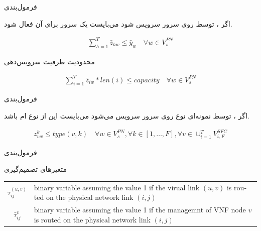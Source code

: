 \documentclass{beamer}
\begin{document}
\begin{persian}
\begin{frame}{فرمول‌بندی} %
    \par
    اگر ، 
    توسط  روی سرور 
    سرویس شود می‌بایست یک  سرور 
    برای آن فعال شود.
    \begin{latin}\begin{align}
        \sum_{h=1}^T
        \bar{z}_{hw} \le \bar{y}_w
        \quad
        \forall w \in V_{s}^{PN}
    \end{align}\end{latin}
    \par
    محدودیت ظرفیت سرویس‌دهی 
    \begin{latin}\begin{align}
        \sum_{i=1}^{T} \bar{z}_{iw} * len(i) \le capacity
        \quad
        \forall w \in V_{s}^{PN}
    \end{align}\end{latin}
\end{frame}
\begin{frame}{فرمول‌بندی} %
    \par
    اگر ، 
    توسط نمونه‌ای نوع 
    روی سرور  سرویس می‌شود می‌بایست
    این  از نوع ام باشد.
    \begin{latin}\begin{align}
        z_{vw}^{k} \le type(v, k)
        \quad
        \forall w \in V_{s}^{PN},
        \forall k \in [1,\ldots, F],
        \forall v \in \cup_{i=1}^T V_{i, F}^{SFC}
    \end{align}\end{latin}
\end{frame}
\begin{frame}{فرمول‌بندی} %
    \par
    متغیرهای تصمیم‌گیری
    \begin{latin}\begin{tabular}{c p{10cm}}
        $\tau^{(u,v)}_{ij}$ & binary variable assuming the value 1 if the virual link $(u,v)$ is routed on the physical network link $(i,j)$\\
        $\bar{\tau}^{v}_{ij}$ & binary variable assuming the value 1 if the managemnt of VNF node $v$ is routed on the physical network link $(i,j)$\\

\end{tabular}
\end{latin}
\end{frame}
\end{persian}
\end{document}
